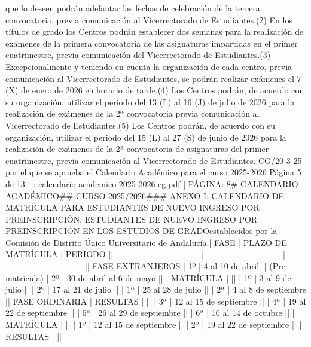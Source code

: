 \documentclass{article}
\begin{document}
\begin{itemize}
{que lo deseen podrán adelantar las fechas de celebración de la tercera convocatoria, previa comunicación al Vicerrectorado de Estudiantes.\n(2) En los títulos de grado los Centros podrán establecer dos semanas para la realización de exámenes de la primera convocatoria de las asignaturas impartidas en el primer cuatrimestre, previa comunicación del Vicerrectorado de Estudiantes.\n(3) Excepcionalmente y teniendo en cuenta la organización de cada centro, previa comunicación al Vicerrectorado de Estudiantes, se podrán realizar exámenes el 7 (X) de enero de 2026 en horario de tarde.\n(4) Los Centros podrán, de acuerdo con su organización, utilizar el periodo del 13 (L) al 16 (J) de julio de 2026 para la realización de exámenes de la 2ª convocatoria previa comunicación al Vicerrectorado de Estudiantes.\n(5) Los Centros podrán, de acuerdo con su organización, utilizar el periodo del 15 (L) al 27 (S) de junio de 2026 para la realización de exámenes de la 2ª convocatoria de asignaturas del primer cuatrimestre, previa comunicación al Vicerrectorado de Estudiantes.\n{} CG/20-3-25 por el que se aprueba el Calendario Académico para el curso 2025-2026  Página 5 de 13\n\n---\n\nFUENTE: calendario-academico-2025-2026-cg.pdf | PÁGINA: 8\n# CALENDARIO ACADÉMICO\n## CURSO 2025/2026\n\n### ANEXO I: CALENDARIO DE MATRÍCULA PARA ESTUDIANTES DE NUEVO INGRESO POR PREINSCRIPCIÓN\n{}. ESTUDIANTES DE NUEVO INGRESO POR PREINSCRIPCIÓN EN LOS ESTUDIOS DE GRADO\n\nPlazos establecidos por la Comisión de Distrito Único Universitario de Andalucía.\n\n| FASE                           | PLAZO DE MATRÍCULA          | PERIODO                     |\n|--------------------------------|-----------------------------|-----------------------------|\n| FASE EXTRANJEROS              | 1º                          | 4 al 10 de abril            |\n| (Pre-matrícula)               | 2º                          | 30 de abril al 6 de mayo    |\n|                                | MATRÍCULA                   |                             |\n|                                | 1º                          | 3 al 9 de julio             |\n|                                | 2º                          | 17 al 21 de julio           |\n|                                | 1ª                          | 25 al 28 de julio           |\n|                                | 2ª                          | 4 al 8 de septiembre        |\n| FASE ORDINARIA                | RESULTAS                    |                             |\n|                                | 3ª                          | 12 al 15 de septiembre       |\n|                                | 4ª                          | 19 al 22 de septiembre       |\n|                                | 5ª                          | 26 al 29 de septiembre       |\n|                                | 6ª                          | 10 al 14 de octubre         |\n|                                | MATRÍCULA                   |                             |\n|                                | 1º                          | 12 al 15 de septiembre       |\n|                                | 2º                          | 19 al 22 de septiembre       |\n|                                | RESULTAS                    |                             |\n|                                }
\end{itemize}
\end{document}
